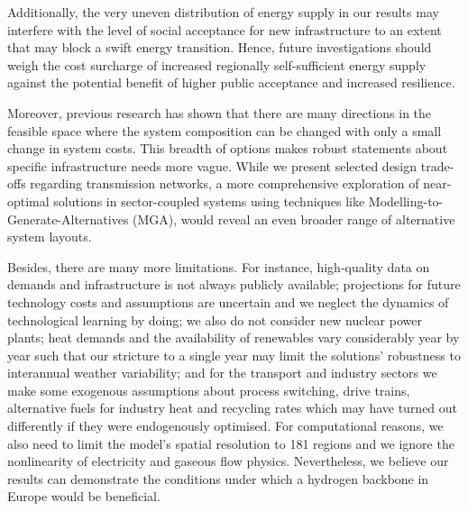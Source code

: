 Additionally, the very uneven distribution of energy supply in our results may
interfere with the level of social acceptance for new infrastructure to an
extent that may block a swift energy transition.
\cite{sasseDistributionalTradeoffs2019,sasseRegionalImpacts2020} Hence, future
investigations should weigh the cost surcharge of increased regionally
self-sufficient energy supply against the potential benefit of higher public
acceptance and increased resilience.

Moreover, previous research has shown that there are many directions in the
feasible space where the system composition can be changed with only a small
change in system costs. This breadth of options makes robust statements about
specific infrastructure needs more vague. While we present selected design
trade-offs regarding transmission networks, a more comprehensive exploration of
near-optimal solutions in sector-coupled systems using techniques like
Modelling-to-Generate-Alternatives (MGA),
\cite{Neumann2019,lombardiPolicyDecision2020,pedersenModelingAll2021,pickeringDiversityOptions2022}
would reveal an even broader range of alternative system layouts.

Besides, there are many more limitations. For instance, high-quality data on
demands and infrastructure is not always publicly available; projections for
future technology costs and assumptions are uncertain and we neglect the
dynamics of technological learning by doing; we also do not consider new nuclear
power plants; heat demands and the availability of renewables vary considerably
year by year such that our stricture to a single year may limit the solutions'
robustness to interannual weather variability; and for the transport and
industry sectors we make some exogenous assumptions about process switching,
drive trains, alternative fuels for industry heat and recycling rates which may
have turned out differently if they were endogenously optimised. For
computational reasons, we also need to limit the model's spatial resolution to
181 regions and we ignore the nonlinearity of electricity and gaseous flow
physics. Nevertheless, we believe our results can demonstrate the conditions
under which a hydrogen backbone in Europe would be beneficial.
